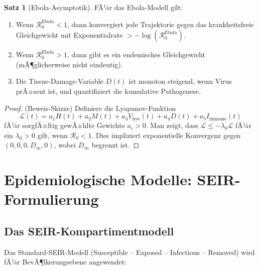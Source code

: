 ﻿\documentclass[a4paper,12pt]{article}
\theoremstyle{definition}
\newtheorem{satz}{Satz}
\begin{document}
\begin{satz}[Ebola-Asymptotik]
FÃ¼r das Ebola-Modell gilt:
\begin{enumerate}
\item Wenn $\mathcal{R}_0^{\text{Ebola}} < 1$, dann konvergiert jede Trajektorie gegen das krankheitsfreie Gleichgewicht mit Exponentialrate $> -\log(\mathcal{R}_0^{\text{Ebola}})$.
\item Wenn $\mathcal{R}_0^{\text{Ebola}} > 1$, dann gibt es ein endemisches Gleichgewicht (mÃ¶glicherweise nicht eindeutig).
\item Die Tissue-Damage-Variable $D(t)$ ist monoton steigend, wenn Virus prÃ¤sent ist, und quantifiziert die kumulative Pathogenese.
\end{enumerate}
\end{satz}

\begin{proof}
(Beweis-Skizze) Definiere die Lyapunov-Funktion
\[
\mathcal{L}(t) = a_1 H(t) + a_2 M(t) + a_3 V_{\text{free}}(t) + a_4 D(t) + a_5 I_{\text{immune}}(t)
\]
fÃ¼r sorgfÃ¤ltig gewÃ¤hlte Gewichte $a_i > 0$. Man zeigt, dass $\dot{\mathcal{L}} \leq -\lambda_0 \mathcal{L}$ fÃ¼r ein $\lambda_0 > 0$ gilt, wenn $\mathcal{R}_0 < 1$. Dies impliziert exponentielle Konvergenz gegen $(0, 0, 0, D_\infty, 0)$, wobei $D_\infty$ begrenzt ist.
\end{proof}

\section{Epidemiologische Modelle: SEIR-Formulierung}

\subsection{Das SEIR-Kompartimentmodell}

Das Standard-SEIR-Modell (Susceptible -- Exposed -- Infectious -- Removed) wird fÃ¼r BevÃ¶lkerungsebene angewendet:
\end{document}
